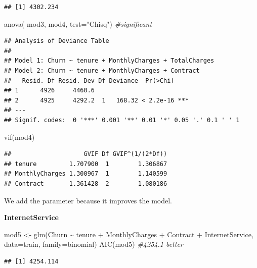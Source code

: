 \documentclass[
  twoside]{article}
\newenvironment{Shaded}{\begin{snugshade}}{\end{snugshade}}
\newcommand{\AttributeTok}[1]{\textcolor[rgb]{0.77,0.63,0.00}{#1}}
\newcommand{\CommentTok}[1]{\textcolor[rgb]{0.56,0.35,0.01}{\textit{#1}}}
\newcommand{\FunctionTok}[1]{\textcolor[rgb]{0.00,0.00,0.00}{#1}}
\newcommand{\NormalTok}[1]{#1}
\newcommand{\OtherTok}[1]{\textcolor[rgb]{0.56,0.35,0.01}{#1}}
\newcommand{\SpecialCharTok}[1]{\textcolor[rgb]{0.00,0.00,0.00}{#1}}
\newcommand{\StringTok}[1]{\textcolor[rgb]{0.31,0.60,0.02}{#1}}
\begin{document}
\begin{verbatim}
## [1] 4302.234
\end{verbatim}

\begin{Shaded}
\begin{Highlighting}[]
\FunctionTok{anova}\NormalTok{( mod3, mod4,  }\AttributeTok{test=}\StringTok{"Chisq"}\NormalTok{) }\CommentTok{\#significant}
\end{Highlighting}
\end{Shaded}

\begin{verbatim}
## Analysis of Deviance Table
## 
## Model 1: Churn ~ tenure + MonthlyCharges + TotalCharges
## Model 2: Churn ~ tenure + MonthlyCharges + Contract
##   Resid. Df Resid. Dev Df Deviance  Pr(>Chi)    
## 1      4926     4460.6                          
## 2      4925     4292.2  1   168.32 < 2.2e-16 ***
## ---
## Signif. codes:  0 '***' 0.001 '**' 0.01 '*' 0.05 '.' 0.1 ' ' 1
\end{verbatim}

\begin{Shaded}
\begin{Highlighting}[]
\FunctionTok{vif}\NormalTok{(mod4)}
\end{Highlighting}
\end{Shaded}

\begin{verbatim}
##                    GVIF Df GVIF^(1/(2*Df))
## tenure         1.707900  1        1.306867
## MonthlyCharges 1.300967  1        1.140599
## Contract       1.361428  2        1.080186
\end{verbatim}

We add the parameter because it improves the model.

\textbf{InternetService}

\begin{Shaded}
\begin{Highlighting}[]
\NormalTok{mod5 }\OtherTok{\textless{}{-}} \FunctionTok{glm}\NormalTok{(Churn }\SpecialCharTok{\textasciitilde{}}\NormalTok{ tenure }\SpecialCharTok{+}\NormalTok{ MonthlyCharges }\SpecialCharTok{+}\NormalTok{ Contract }\SpecialCharTok{+}\NormalTok{ InternetService, }\AttributeTok{data=}\NormalTok{train, }\AttributeTok{family=}\NormalTok{binomial)}
\FunctionTok{AIC}\NormalTok{(mod5) }\CommentTok{\#4254.1 better}
\end{Highlighting}
\end{Shaded}

\begin{verbatim}
## [1] 4254.114
\end{verbatim}
\end{document}

